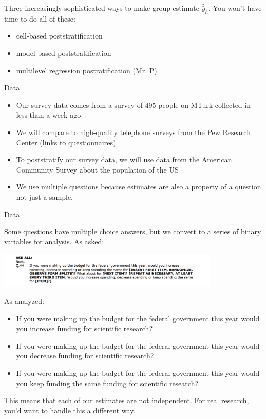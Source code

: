 \documentclass[aspectratio=169]{beamer}
\begin{document}
\begin{frame}

Three increasingly sophisticated ways to make group estimate $\hat{\bar{y}}_h$.  You won't have time to do all of these:
\begin{itemize}
\item cell-based poststratification
\item model-based poststratification
\item multilevel regression postratification (Mr. P)
\end{itemize}

\end{frame}
\begin{frame}{Data}

\begin{itemize}
\item Our survey data comes from a survey of 495 people on MTurk collected in less than a week ago
\item We will compare to high-quality telephone surveys from the Pew Research Center (links to \href{https://github.com/compsocialscience/summer-institute/blob/master/2019/materials/day4-surveys/activity/2019_pew_benchmark_data.csv}{questionnaires})
\item To poststratify our survey data, we will use data from the American Community Survey about the population of the US
\item We use multiple questions because estimates are also a property of a question not just a sample.
\end{itemize}

\end{frame}
\begin{frame}{Data}

Some questions have multiple choice answers, but we convert to a series of binary variables for analysis.  As asked:
\begin{center}
\includegraphics[width=0.8\textwidth]{figures/question_text_pew}
\end{center}

As analyzed:
\begin{itemize}
\item If you were making up the budget for the federal government this year would you increase funding for scientific research?
\item If you were making up the budget for the federal government this year would you decrease funding for scientific research?
\item If you were making up the budget for the federal government this year would you keep funding the same funding for scientific research?
\end{itemize}

\vfill
This means that each of our estimates are not independent.  For real research, you'd want to handle this a different way.

\end{frame}
\end{document}

